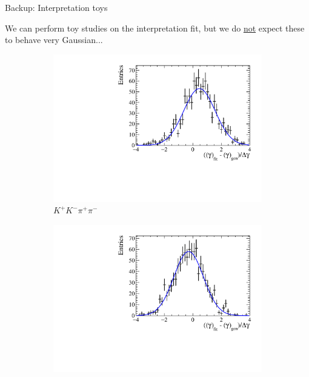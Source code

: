 \documentclass[xcolor={dvipsnames}]{beamer}
\begin{document}
\begin{frame}{Backup: Interpretation toys}
  \begin{center}
    We can perform toy studies on the interpretation fit, but we do \underline{not} expect these to behave very Gaussian...
  \end{center}
  \begin{figure}
    \centering
    \begin{subfigure}{0.5\textwidth}
      \centering
      \includegraphics[width=1.0\textwidth]{Plots/gamma_pull_toys_KKpipi.pdf}
      \vspace{-0.3cm}
      \caption*{$K^+K^-\pi^+\pi^-$}
    \end{subfigure}%
    \begin{subfigure}{0.5\textwidth}
      \centering
      \includegraphics[width=1.0\textwidth]{Plots/gamma_pull_toys_pipipipi.pdf}

\end{subfigure}
\end{figure}
\end{frame}
\end{document}
